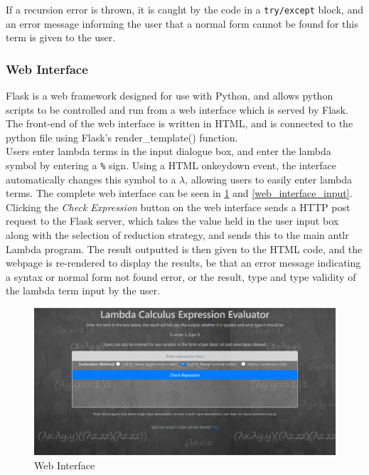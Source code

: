 \documentclass[a4paper,12pt]{report}
\begin{document}
If a recursion error is thrown, it is caught by the code in a \texttt{try/except} block, and an error message informing the user that a normal form cannot be found for this term is given to the user.

\subsubsection{Web Interface}

Flask is a web framework designed for use with Python, and allows python scripts to be controlled and run from a web interface which is served by Flask\cite{FullStack2019}. The front-end of the web interface is written in HTML, and is connected to the python file using Flask's render_template() function.\\

Users enter lambda terms in the input dialogue box, and enter the lambda symbol by entering a \texttt{\%} sign. Using a HTML onkeydown event, the interface automatically changes this symbol to a $\lambda$, allowing users to easily enter lambda terms. The complete web interface can be seen in \ref{web_interface_no_input} and \ref{web_interface_input}.\\

Clicking the \textit{Check Expression} button on the web interface sends a HTTP post request to the Flask server, which takes the value held in the user input box along with the selection of reduction strategy, and sends this to the main antlr Lambda program. The result outputted is then given to the HTML code, and the webpage is re-rendered to display the results, be that an error message indicating a syntax or normal form not found error, or the result, type and type validity of the lambda term input by the user.

\begin{figure}[p]
	\includegraphics[scale=0.4]{images/web_interface_no_input}
	\centering
	\caption{Web Interface}
	\label{web_interface_no_input}
\end{figure}
\end{document}

